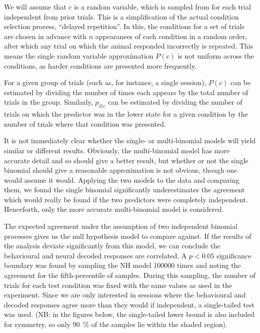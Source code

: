 We will assume that $c$ is a random variable, which is sampled from for each trial independent from prior trials.
This is a simplification of the actual condition selection process, ``delayed repetition''.
In this, the conditions for a set of trials are chosen in advance with $n$ appearances of each condition in a random order, after which any trial on which the animal responded incorrectly is repeated.
This means the single random variable approximation $P(c)$ is not uniform across the conditions, as harder conditions are presented more frequently.

For a given group of trials (such as, for instance, a single session), $P(c)$ can be estimated by dividing the number of times each appears by the total number of trials in the group.
Similarly, $p_{il|c}$ can be estimated by dividing the number of trials on which the predictor was in the lower state for a given condition by the number of trials where that condition was presented.

It is not immediately clear whether the single- or multi-binomial models will yield similar or different results.
Obviously, the multi-binomial model has more accurate detail and so should give a better result, but whether or not the single binomial should give a reasonable approximation is not obvious, though one would assume it would.
Applying the two models to the data and comparing them, we found the single binomial significantly underestimates the agreement which would really be found if the two predictors were completely independent.
Henceforth, only the more accurate multi-binomial model is considered.

The expected agreement under the assumption of two independent binomial processes gives us the null hypothesis model to compare against.
If the results of the analysis deviate significantly from this model, we can conclude the behavioural and neural decoded responses are correlated.
A $p<0.05$ significance boundary was found by sampling the \ac{NH} model \num{100000} times and noting the agreement for the fifth-percentile of samples.
During this sampling, the number of trials for each test condition was fixed with the same values as used in the experiment.
Since we are only interested in sessions where the behavioural and decoded responses agree more than they would if independent, a single-tailed test was used.
(NB: in the figures below, the single-tailed lower bound is also included for symmetry, so only \SI{90}{\percent} of the samples lie within the shaded region).

